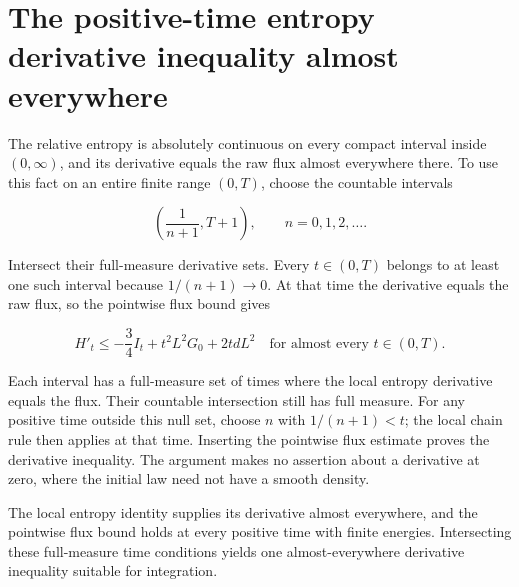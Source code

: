 \documentclass[11pt,a4paper]{article}
\begin{document}
\section{\texorpdfstring{The positive-time entropy derivative inequality almost everywhere}{The positive-time entropy derivative inequality almost everywhere}}


The relative entropy is absolutely continuous on every compact interval inside \((0,\infty)\), and its derivative equals the raw flux almost everywhere there. To use this fact on an entire finite range \((0,T)\), choose the countable intervals

\[\left(\frac1{n+1},T+1\right),\qquad n=0,1,2,\ldots.\]

Intersect their full-measure derivative sets. Every \(t\in(0,T)\) belongs to at least one such interval because \(1/(n+1)\to0\). At that time the derivative equals the raw flux, so the pointwise flux bound gives

\[H'_t\le-\frac34 I_t+t^2L^2G_0+2tdL^2\quad\text{for almost every }t\in(0,T).\]

Each interval has a full-measure set of times where the local entropy derivative equals the flux. Their countable intersection still has full measure. For any positive time outside this null set, choose \(n\) with \(1/(n+1)<t\); the local chain rule then applies at that time. Inserting the pointwise flux estimate proves the derivative inequality. The argument makes no assertion about a derivative at zero, where the initial law need not have a smooth density.



The local entropy identity supplies its derivative almost everywhere, and the pointwise flux bound holds at every positive time with finite energies. Intersecting these full-measure time conditions yields one almost-everywhere derivative inequality suitable for integration.
\end{document}
